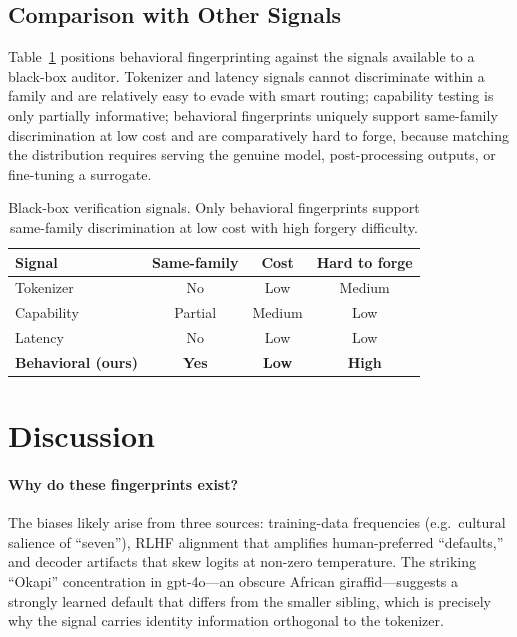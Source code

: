 \documentclass[10pt,twocolumn,letterpaper]{article}
\begin{document}
\subsection{Comparison with Other Signals}
\label{sec:compare}
Table~\ref{tab:methods} positions behavioral fingerprinting against the signals available to a black-box auditor. Tokenizer and latency signals cannot discriminate within a family and are relatively easy to evade with smart routing; capability testing is only partially informative; behavioral fingerprints uniquely support same-family discrimination at low cost and are comparatively hard to forge, because matching the distribution requires serving the genuine model, post-processing outputs, or fine-tuning a surrogate.

\begin{table}[t]
\centering
\small
\caption{Black-box verification signals. Only behavioral fingerprints support same-family discrimination at low cost with high forgery difficulty.}
\label{tab:methods}
\begin{tabular}{lccc}
\toprule
Signal & Same-family & Cost & Hard to forge \\
\midrule
Tokenizer & No & Low & Medium \\
Capability & Partial & Medium & Low \\
Latency & No & Low & Low \\
\textbf{Behavioral (ours)} & \textbf{Yes} & \textbf{Low} & \textbf{High} \\
\bottomrule
\end{tabular}
\end{table}

\section{Discussion}
\label{sec:disc}

\paragraph{Why do these fingerprints exist?}
The biases likely arise from three sources: training-data frequencies (e.g.\ cultural salience of ``seven''), RLHF alignment that amplifies human-preferred ``defaults,'' and decoder artifacts that skew logits at non-zero temperature. The striking ``Okapi'' concentration in gpt-4o---an obscure African giraffid---suggests a strongly learned default that differs from the smaller sibling, which is precisely why the signal carries identity information orthogonal to the tokenizer.
\end{document}
